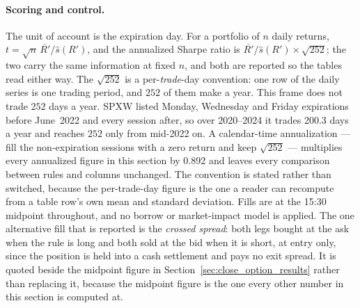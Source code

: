 \paragraph{Scoring and control.} The unit of account is the expiration
day. For a portfolio of $n$ daily returns,
$t = \sqrt{n}\,\overline{R'}/\hat{s}(R')$, and the annualized Sharpe
ratio is $\overline{R'}/\hat{s}(R')\times\sqrt{252}$; the two carry the
same information at fixed $n$, and both are reported so the tables read
either way. The $\sqrt{252}$ is a per-\emph{trade}-day convention: one row
of the daily series is one trading period, and $252$ of them make a year.
This frame does not trade $252$ days a year. SPXW listed Monday, Wednesday
and Friday expirations before June~2022 and every session after, so over
2020--2024 it trades 200.3 days a year and reaches $252$ only from
mid-2022 on. A calendar-time annualization --- fill the non-expiration
sessions with a zero return and keep $\sqrt{252}$ --- multiplies every
annualized figure in this section by 0.892 and leaves every comparison
between rules and columns unchanged. The convention is stated rather than
switched, because the per-trade-day figure is the one a reader can
recompute from a table row's own mean and standard deviation. Fills are at
the 15:30 midpoint throughout, and no borrow or
market-impact model is applied. The one alternative fill that is reported
is the \emph{crossed spread}: both legs bought at the ask when the rule is
long and both sold at the bid when it is short, at entry only, since the
position is held into a cash settlement and pays no exit spread. It is
quoted beside the midpoint figure in
Section~\ref{sec:close_option_results} rather than replacing it, because
the midpoint figure is the one every other number in this section is
computed at.

